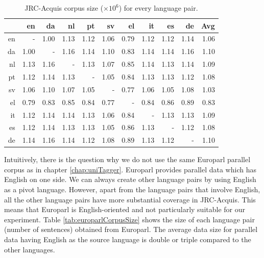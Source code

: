 \begin{table}[htbp]
  \centering

    \begin{tabular}{r|rrrrrrrrr|r}
          & en    & da    & nl    & pt    & sv    & el    & it    & es    & de    & Avg \\\hline
    en    & -     & 1.00  & 1.13  & 1.12  & 1.06  & 0.79  & 1.12  & 1.12  & 1.14  & 1.06 \\
    da    & 1.00  & -     & 1.16  & 1.14  & 1.10  & 0.83  & 1.14  & 1.14  & 1.16  & 1.10 \\
    nl    & 1.13  & 1.16  & -     & 1.13  & 1.07  & 0.85  & 1.14  & 1.13  & 1.14  & 1.09 \\
    pt    & 1.12  & 1.14  & 1.13  & -     & 1.05  & 0.84  & 1.13  & 1.13  & 1.12  & 1.08 \\
    sv    & 1.06  & 1.10  & 1.07  & 1.05  & -     & 0.77  & 1.06  & 1.05  & 1.08  & 1.03 \\
    el    & 0.79  & 0.83  & 0.85  & 0.84  & 0.77  & -     & 0.84  & 0.86  & 0.89  & 0.83 \\
    it    & 1.12  & 1.14  & 1.14  & 1.13  & 1.06  & 0.84  & -     & 1.13  & 1.13  & 1.09 \\
    es    & 1.12  & 1.14  & 1.13  & 1.13  & 1.05  & 0.86  & 1.13  & -     & 1.12  & 1.08 \\
    de    & 1.14  & 1.16  & 1.14  & 1.12  & 1.08  & 0.89  & 1.13  & 1.12  & -     & 1.10 \\
    \end{tabular}%
  \caption{JRC-Acquis corpus size ($\times 10^6$) for every language pair.}
  \label{tab:jrcAcquisSizeEachPair}%
\end{table}%

Intuitively, there is the question why we do not use the same Europarl parallel corpus as in chapter \ref{chap:uniTagger}. Europarl provides parallel data which has English on one side. We can always create other language pairs by using English as a pivot language. However, apart from the language pairs that involve English, all the other language pairs have more substantial coverage in JRC-Acquis. This means that Europarl is English-oriented and not particularly suitable for our experiment. Table \ref{tab:europarlCorpusSize} shows the size of each language pair (number of sentences) obtained from Europarl. The average data size for parallel data having English as the source language is double or triple compared to the other languages. 

